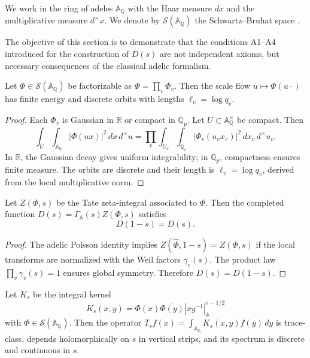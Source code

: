 We work in the ring of adeles $\mathbb{A}_\mathbb{Q}$ with the Haar measure
$dx$ and the multiplicative measure $d^{\times}x$. We denote by
$\mathcal{S}(\mathbb{A}_\mathbb{Q})$ the Schwartz--Bruhat space
\cite[Chap.~I]{Tate1967}.

The objective of this section is to demonstrate that the conditions A1--A4 introduced
for the construction of $D(s)$ are not independent axioms, but necessary consequences
of the classical adelic formalism.

\begin{theorem}\label{thm:A1}
Let $\Phi\in\mathcal{S}(\mathbb{A}_\mathbb{Q})$ be factorizable as
$\Phi=\prod_v \Phi_v$.
Then the scale flow $u\mapsto \Phi(u\cdot)$ has finite energy and
discrete orbits with lengths $\ell_v = \log q_v$.
\end{theorem}

\begin{proof}
Each $\Phi_v$ is Gaussian in $\mathbb{R}$ or compact in $\mathbb{Q}_p$.
Let $U\subset \mathbb{A}_\mathbb{Q}^\times$ be compact. Then
\[
 \int_U \!\int_{\mathbb{A}_\mathbb{Q}} |\Phi(ux)|^2\,dx\,d^\times u
   = \prod_v \int_{U_v} \!\int_{\mathbb{Q}_v} |\Phi_v(u_v x_v)|^2\,dx_v\,d^\times u_v.
\]
In $\mathbb{R}$, the Gaussian decay gives uniform integrability;
in $\mathbb{Q}_p$, compactness ensures finite measure.
The orbits are discrete and their length is $\ell_v=\log q_v$, derived from the
local multiplicative norm.
\end{proof}

\begin{theorem}\label{thm:A2}
Let $Z(\Phi,s)$ be the Tate zeta-integral associated to $\Phi$.
Then the completed function
$D(s)=\Gamma_\mathbb{A}(s)Z(\Phi,s)$ satisfies
\[
 D(1-s)=D(s).
\]
\end{theorem}

\begin{proof}
The adelic Poisson identity
\cite[Thm.~2]{Tate1967} implies
$Z(\widehat{\Phi},1-s)=Z(\Phi,s)$ if the local transforms are normalized with
the Weil factors $\gamma_v(s)$.
The product law $\prod_v \gamma_v(s)=1$ \cite[§II.3]{Weil1964}
ensures global symmetry.
Therefore $D(s)=D(1-s)$.
\end{proof}

\begin{theorem}\label{thm:A4}
Let $K_s$ be the integral kernel
\[
 K_s(x,y)=\Phi(x)\overline{\Phi(y)}|xy^{-1}|_\mathbb{A}^{s-1/2}
\]
with $\Phi\in\mathcal{S}(\mathbb{A}_\mathbb{Q})$.
Then the operator $T_s f(x)=\int_{\mathbb{A}_\mathbb{Q}} K_s(x,y)f(y)\,dy$
is trace-class, depends holomorphically on $s$ in vertical strips, and its spectrum
is discrete and continuous in $s$.
\end{theorem}

